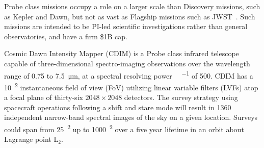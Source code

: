 \documentclass{ws-jai}
\begin{document}

Probe class missions occupy a role on a larger scale than Discovery missions, such as Kepler and Dawn, but not as vast as Flagship missions such as JWST~\cite{probeclasswp}.
Such missions are intended to be PI-led scientific investigations rather than general observatories, and have a firm \$1B cap.

Cosmic Dawn Intensity Mapper (CDIM) is a Probe class infrared telescope capable of three-dimensional spectro-imaging observations over the wavelength range of 0.75 to \SI{7.5}{\micro\meter}, at a spectral resolving power \si{\Delta\lambda\per\lambda} of 500.
CDIM has a \SI{10}{\deg\squared} instantaneous field of view (FoV) utilizing linear variable filters (LVFs) atop a focal plane of thirty-six $2048\times2048$ detectors.
The survey strategy using spacecraft operations following a shift and stare mode will result in 1360 independent narrow-band spectral images of the sky on a given location.
Surveys could span from \SI{25}{\deg\squared} up to \SI{1000}{\deg\squared} over a five year lifetime in an orbit about Lagrange point L$_{2}$\@.
\end{document}
